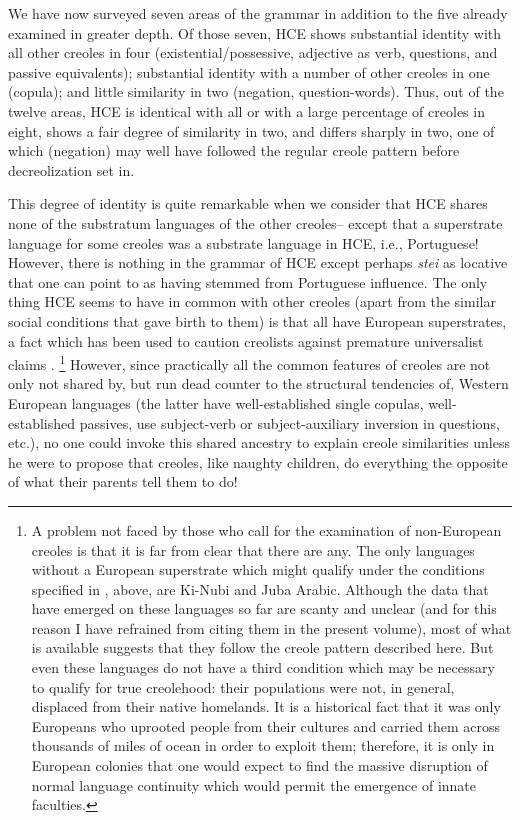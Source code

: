 We have now surveyed seven areas of the grammar in addition to the five already examined in greater depth. Of those seven, HCE shows substantial identity with all other creoles in four (existential/possessive, adjective as verb, questions, and passive equivalents); substantial iden\-tity with a number of other creoles in one (copula); and little simi\-larity in two (negation, question-words). Thus, out of the twelve areas, HCE is identical with all or with a large percentage of creoles in eight, shows a fair degree of similarity in two, and differs sharply in two, one of which (negation) may well have followed the regular creole pattern before decreolization set in.

This degree of identity is quite remarkable when we consider that HCE shares none of the substratum languages of the other creoles--%
except that a superstrate language for some creoles was a substrate language in HCE, i.e., Portuguese! However, there is nothing in the grammar of HCE except perhaps \textit{stei} as locative that one can point to as having stemmed from Portuguese influence. The only thing HCE seems to have in common with other creoles (apart from the simi\-lar social conditions that gave birth to them) is that all have European superstrates, a fact which has been used to caution creolists against premature universalist claims \citep{Reinecke1977}.%
\footnote{A problem not faced by those who call for the examination of non-European creoles is that it is far from clear that there are any. The only languages without a European superstrate which might qualify under the conditions specified in , above, are Ki-Nubi and Juba Arabic. Although the data that have emerged on these lan\-guages so far are scanty and unclear (and for this reason I have refrained from citing them in the present volume), most of what is available suggests that they follow the creole pattern described here. But even these languages do not have a third condition which may be necessary to qualify for true creolehood: their populations were not, in general, displaced from their native homelands. It is a historical fact that it was only Europeans who uprooted people from their cultures and carried them across thousands of miles of ocean in order to exploit them; therefore, it is only in European colonies that one would expect to find the massive disruption of normal language continuity which would permit the emergence of innate faculties.} 
However, since practi\-cally all the common features of creoles are not only not shared by, but run dead counter to the structural tendencies of, Western Euro\-pean languages (the latter have well-established single copulas, well-established passives, use subject-verb or subject-auxiliary inversion in questions, etc.), no one could invoke this shared ancestry to explain creole similarities unless he were to propose that creoles, like naughty children, do everything the opposite of what their parents tell them to do!

